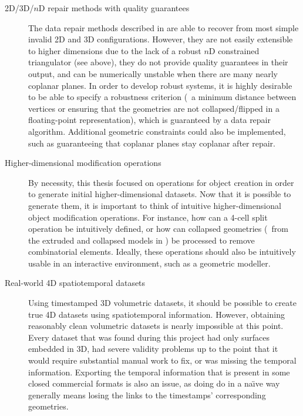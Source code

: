 \begin{description}
\item[2D/3D/$n$D repair methods with quality guarantees] The data repair methods described in  are able to recover from most simple invalid 2D and 3D configurations.
However, they are not easily extensible to higher dimensions due to the lack of a robust $n$D constrained triangulator (see above), they do not provide quality guarantees in their output, and can be numerically unstable when there are many nearly coplanar planes.
In order to develop robust systems, it is highly desirable to be able to specify a robustness criterion (\eg\ a minimum distance between vertices or ensuring that the geometries are not collapsed/flipped in a floating-point representation), which is guaranteed by a data repair algorithm.
Additional geometric constraints could also be implemented, such as guaranteeing that coplanar planes stay coplanar after repair.

\item[Higher-dimensional modification operations] By necessity, this thesis focused on operations for object creation in order to generate initial higher-dimensional datasets.
Now that it is possible to generate them, it is important to think of intuitive higher-dimensional object modification operations.
For instance, how can a 4-cell split operation be intuitively defined, or how can collapsed geometries (\eg\ from the extruded and collapsed models in ) be processed to remove combinatorial elements.
Ideally, these operations should also be intuitively usable in an interactive environment, such as a geometric modeller.

\item[Real-world 4D spatiotemporal datasets] Using timestamped 3D volumetric datasets, it should be possible to create true 4D datasets using spatiotemporal information.
However, obtaining reasonably clean volumetric datasets is nearly impossible at this point.
Every dataset that was found during this project had only surfaces embedded in 3D, had severe validity problems up to the point that it would require substantial manual work to fix, or was missing the temporal information.
Exporting the temporal information that is present in some closed commercial formats is also an issue, as doing do in a na{\"\i}ve way generally means losing the links to the timestamps' corresponding geometries.

\end{description}